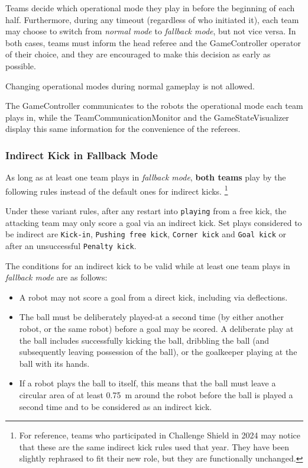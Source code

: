 Teams decide which operational mode they play in before the beginning of each half.
Furthermore, during any timeout (regardless of who initiated it), each team
may choose to switch from \textit{normal mode} to \textit{fallback mode}, but not vice versa.
In both cases, teams must inform the head referee and the GameController operator
of their choice, and they are encouraged to make this decision as early as possible.

Changing operational modes during normal gameplay is not allowed.

The GameController communicates to the robots the operational mode each team plays in,
while the TeamCommunicationMonitor and the GameStateVisualizer display this
same information for the convenience of the referees.

\subsubsection{Indirect Kick in Fallback Mode}
\label{sec:indirect_kick_old}

As long as at least one team plays in \textit{fallback mode}, \textbf{both teams}
play by the following rules instead of the default ones for indirect kicks.
\footnote{For reference, teams who participated in Challenge Shield in 2024 may notice that these are the same indirect kick rules used that year. They have been slightly rephrased to fit their new role, but they are functionally unchanged.}

Under these variant rules, after any restart into \texttt{playing} from a free kick,
the attacking team may only score a goal via an indirect kick.
Set plays considered to be indirect are \texttt{Kick-in}, \texttt{Pushing free kick},
\texttt{Corner kick} and \texttt{Goal kick} or after an unsuccessful \texttt{Penalty kick}.

The conditions for an indirect kick to be valid while at least one team
plays in \textit{fallback mode} are as follows:

\begin{itemize}
  \item A robot may not score a goal from a direct kick, including via deflections.
  \item The ball must be deliberately played-at a second time (by either another robot, or the same robot) before a goal may be scored.
    A deliberate play at the ball includes successfully kicking the ball, dribbling the ball (and subsequently leaving possession of the ball), or the goalkeeper playing at the ball with its hands.
  \item If a robot plays the ball to itself, this means that the ball must leave a circular area of at least \qty{0.75}{\metre} around the robot before the ball is played a second time and to be considered as an indirect kick.
\end{itemize}

